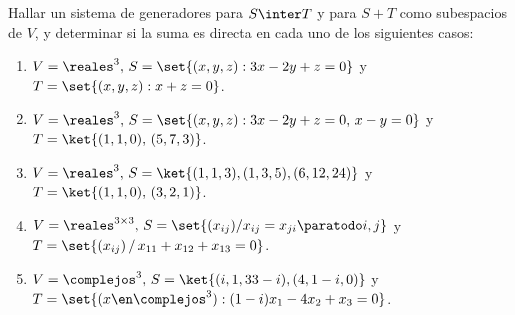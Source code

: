 \begin{enunciado}{\ejercicio}
  Hallar un sistema de generadores para $S \inter T$ y para $S + T$ como subespacios de $V$, y
  determinar si la suma es directa en cada uno de los siguientes casos:
  \begin{enumerate}[label=(\alph*)]
    \item $V = \reales^3,\, S = \set{(x,y,z) : 3x - 2y + z = 0}$ y $T = \set{(x, y ,z) : x + z =0}$.
    \item $V = \reales^3,\, S = \set{(x,y,z) : 3x - 2y + z = 0,\, x-y = 0}$ y $T = \ket{(1,1,0),\, (5,7,3)}$.
    \item $V = \reales^3,\, S = \ket{(1,1,3), (1,3,5), (6,12,24)}$ y $T = \ket{(1,1,0),\, (3,2,1)}$.
    \item $V = \reales^{3 \times 3},\, S = \set{(x_{ij}) / x_{ij} = x_{ji} \paratodo i, j}$ y $T = \set{(x_{ij})\, /\,  x_{11} + x_{12} + x_{13} = 0}$.
    \item $V = \complejos^3,\, S = \ket{(i, 1, 3 3-i), (4,1 - i, 0)}$ y $T = \set{(x \en \complejos^3) : (1 - i)x_1 - 4x_2 + x_3 = 0}$.
  \end{enumerate}
\end{enunciado}

